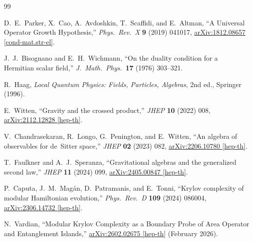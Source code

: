 \documentclass[12pt,a4paper]{article}
\begin{document}
\begin{thebibliography}{99}

D.~E.~Parker, X.~Cao, A.~Avdoshkin, T.~Scaffidi, and E.~Altman,
``A Universal Operator Growth Hypothesis,''
\textit{Phys.\ Rev.\ X} \textbf{9} (2019) 041017,
\href{https://arxiv.org/abs/1812.08657}{arXiv:1812.08657 [cond-mat.str-el]}.

J.~J.~Bisognano and E.~H.~Wichmann,
``On the duality condition for a Hermitian scalar field,''
\textit{J.\ Math.\ Phys.}\ \textbf{17} (1976) 303--321.

R.~Haag, \textit{Local Quantum Physics: Fields, Particles, Algebras},
2nd ed., Springer (1996).

E.~Witten,
``Gravity and the crossed product,''
\textit{JHEP} \textbf{10} (2022) 008,
\href{https://arxiv.org/abs/2112.12828}{arXiv:2112.12828 [hep-th]}.

V.~Chandrasekaran, R.~Longo, G.~Penington, and E.~Witten,
``An algebra of observables for de~Sitter space,''
\textit{JHEP} \textbf{02} (2023) 082,
\href{https://arxiv.org/abs/2206.10780}{arXiv:2206.10780 [hep-th]}.

T.~Faulkner and A.~J.~Speranza,
``Gravitational algebras and the generalized second law,''
\textit{JHEP} \textbf{11} (2024) 099,
\href{https://arxiv.org/abs/2405.00847}{arXiv:2405.00847 [hep-th]}.

P.~Caputa, J.~M.~Mag\'{a}n, D.~Patramanis, and E.~Tonni,
``Krylov complexity of modular Hamiltonian evolution,''
\textit{Phys.\ Rev.\ D} \textbf{109} (2024) 086004,
\href{https://arxiv.org/abs/2306.14732}{arXiv:2306.14732 [hep-th]}.

N.~Vardian,
``Modular Krylov Complexity as a Boundary Probe of Area Operator
and Entanglement Islands,''
\href{https://arxiv.org/abs/2602.02675}{arXiv:2602.02675 [hep-th]}
(February 2026).


\end{thebibliography}
\end{document}
